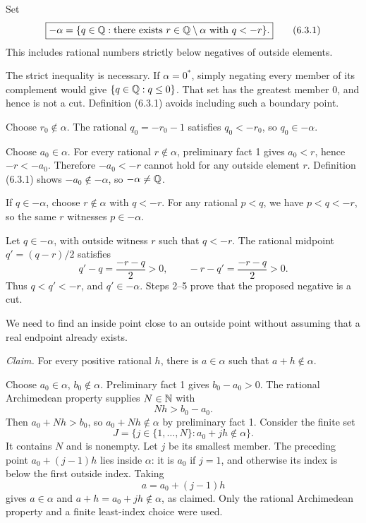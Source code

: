 
Set
\[
 \boxed{-\alpha
  =\{q\in\mathbb{Q}:\text{there exists }r\in\mathbb{Q}\setminus\alpha
                         \text{ with }q<-r\}.}
 \tag{6.3.1}
\]
This includes rational numbers strictly below negatives of outside
elements.

The strict inequality is necessary. If $\alpha=0^*$, simply negating
every member of its complement would give $\{q\in\mathbb{Q}:q\le0\}$.
That set has the greatest member $0$, and hence is not a cut.
Definition (6.3.1) avoids including such a boundary point.

Choose $r_0\notin\alpha$. The rational $q_0=-r_0-1$ satisfies
$q_0<-r_0$, so $q_0\in-\alpha$.

Choose $a_0\in\alpha$. For every rational $r\notin\alpha$,
preliminary fact 1 gives $a_0<r$, hence $-r<-a_0$.
Therefore $-a_0<-r$ cannot hold for any outside element $r$.
Definition (6.3.1) shows $-a_0\notin-\alpha$, so $-\alpha\ne\mathbb{Q}$.

If $q\in-\alpha$, choose $r\notin\alpha$ with $q<-r$.
For any rational $p<q$, we have $p<q<-r$, so the same $r$
witnesses $p\in-\alpha$.

Let $q\in-\alpha$, with outside witness $r$ such that $q<-r$.
The rational midpoint $q'=(q-r)/2$ satisfies
\[
 q'-q=\frac{-r-q}{2}>0,\qquad
 -r-q'=\frac{-r-q}{2}>0.
\]
Thus $q<q'<-r$, and $q'\in-\alpha$.
Steps 2--5 prove that the proposed negative is a cut.

We need to find an inside point close to an outside point without
assuming that a real endpoint already exists.

\emph{Claim.} For every positive rational $h$, there is $a\in\alpha$
such that $a+h\notin\alpha$.

Choose $a_0\in\alpha$, $b_0\notin\alpha$. Preliminary fact 1 gives
$b_0-a_0>0$. The rational Archimedean property supplies $N\in\mathbb{N}$ with
\[
 Nh>b_0-a_0.
\]
Then $a_0+Nh>b_0$, so $a_0+Nh\notin\alpha$ by preliminary fact 1.
Consider the finite set
\[
 J=\{j\in\{1,\ldots,N\}:a_0+jh\notin\alpha\}.
\]
It contains $N$ and is nonempty. Let $j$ be its smallest member.
The preceding point $a_0+(j-1)h$ lies inside $\alpha$: it is $a_0$
if $j=1$, and otherwise its index is below the first outside index.
Taking
\[
 a=a_0+(j-1)h
\]
gives $a\in\alpha$ and $a+h=a_0+jh\notin\alpha$, as claimed.
Only the rational Archimedean property and a finite least-index
choice were used.

